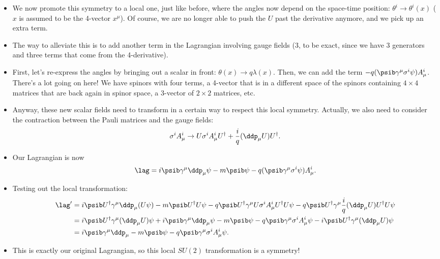 \begin{itemize}
    \item We now promote this symmetry to a local one, just like before, where the angles now depend on the space-time position: $\theta^i \rightarrow \theta^i(x)$ ($x$ is assumed to be the 4-vector $x^{\mu}$). Of course, we are no longer able to push the $U$ past the derivative anymore, and we pick up an extra term.
    \item The way to alleviate this is to add another term in the Lagrangian involving gauge fields (3, to be exact, since we have 3 generators and three terms that come from the 4-derivative).
    \item First, let's re-express the angles by bringing out a scalar in front: $\theta(x) \rightarrow q\lambda(x)$. Then, we can add the term $-q(\psib \gamma^{\mu} \sigma^i \psi) A_{\mu}^i$. There's a lot going on here! We have spinors with four terms, a 4-vector that is in a different space of the spinors containing $4\times4$ matrices that are back again in spinor space, a 3-vector of $2\times2$ matrices, etc. 
    \item Anyway, these new scalar fields need to transform in a certain way to respect this local symmetry. Actually, we also need to consider the contraction between the Pauli matrices and the gauge fields:
        \begin{equation}
            \sigma^i A_{\mu}^i \rightarrow U \sigma^i A_{\mu}^i U^{\dagger} + \frac{i}{q}(\ddp_{\mu} U)U^{\dagger}.
        \end{equation}
    \item Our Lagrangian is now
        \begin{equation}
            \lag = i\psib \gamma^{\mu}\ddp_{\mu} \psi - m\psib\psi - q(\psib \gamma^{\mu} \sigma^i \psi) A_{\mu}^i.
        \end{equation}
    \item Testing out the local transformation:
        \begin{align}
            \lag' &= i\psib U^{\dagger} \gamma^{\mu}\ddp_{\mu}(U \psi) - m\psib U^{\dagger}U \psi - q\psib U^{\dagger} \gamma^{\mu} U\sigma^iA_{\mu}^i U^{\dagger}U \psi - q\psib U^{\dagger} \gamma^{\mu} \frac{i}{q}(\ddp_{\mu}U)U^{\dagger}U \psi \\
            &= i\psib U^{\dagger} \gamma^{\mu}(\ddp_{\mu} U)\psi + i\psib \gamma^{\mu}\ddp_{\mu}\psi - m\psib\psi - q\psib \gamma^{\mu} \sigma^iA_{\mu}^i \psi - i\psib U^{\dagger} \gamma^{\mu} (\ddp_{\mu} U)\psi \\
            &= i\psib \gamma^{\mu}\ddp_{\mu} - m\psib\psi - q\psib \gamma^{\mu} \sigma^iA_{\mu}^i \psi.
        \end{align}
    \item This is exactly our original Lagrangian, so this local $SU(2)$ transformation is a symmetry!
\end{itemize}

